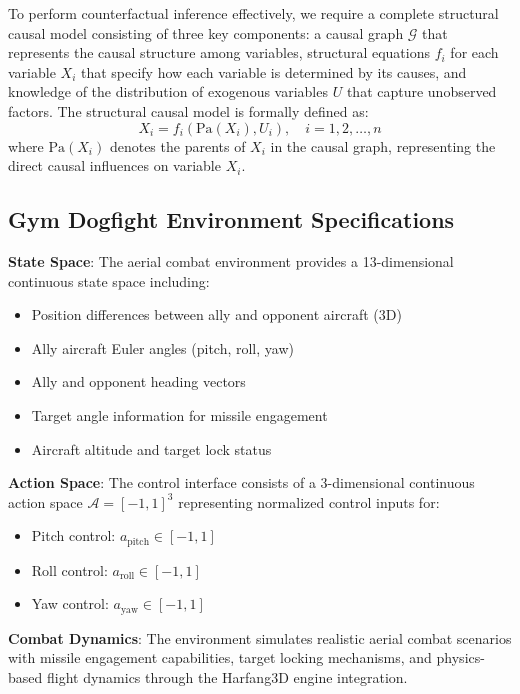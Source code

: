 \documentclass[12pt]{article}
\begin{document}
To perform counterfactual inference effectively, we require a complete structural causal model consisting of three key components: a causal graph $\mathcal{G}$ that represents the causal structure among variables, structural equations $f_i$ for each variable $X_i$ that specify how each variable is determined by its causes, and knowledge of the distribution of exogenous variables $U$ that capture unobserved factors. The structural causal model is formally defined as:
\begin{equation}
X_i = f_i(\text{Pa}(X_i), U_i), \quad i = 1, 2, \ldots, n
\end{equation}
where $\text{Pa}(X_i)$ denotes the parents of $X_i$ in the causal graph, representing the direct causal influences on variable $X_i$.

\subsection{Gym Dogfight Environment Specifications}

\textbf{State Space}: The aerial combat environment provides a 13-dimensional continuous state space including:
\begin{itemize}
    \item Position differences between ally and opponent aircraft (3D)
    \item Ally aircraft Euler angles (pitch, roll, yaw)
    \item Ally and opponent heading vectors
    \item Target angle information for missile engagement
    \item Aircraft altitude and target lock status
\end{itemize}

\textbf{Action Space}: The control interface consists of a 3-dimensional continuous action space $\mathcal{A} = [-1,1]^3$ representing normalized control inputs for:
\begin{itemize}
    \item Pitch control: $a_{\text{pitch}} \in [-1,1]$
    \item Roll control: $a_{\text{roll}} \in [-1,1]$  
    \item Yaw control: $a_{\text{yaw}} \in [-1,1]$
\end{itemize}

\textbf{Combat Dynamics}: The environment simulates realistic aerial combat scenarios with missile engagement capabilities, target locking mechanisms, and physics-based flight dynamics through the Harfang3D engine integration.
\end{document}
